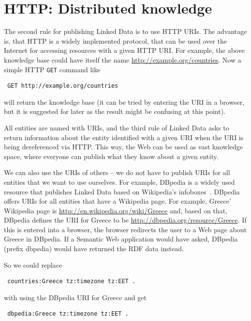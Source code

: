 \section{HTTP: Distributed knowledge}
\label{http}

The second rule for publishing Linked Data is to use HTTP URIs.
The advantage is, that HTTP is a widely implemented protocol, that can be used over the Internet for accessing resources with a given HTTP URI.
For example, the above knowledge base could have itself the name \url{http://example.org/countries}.
Now a simple HTTP \texttt{GET} command like

\begin{verbatim}
 GET http://example.org/countries
\end{verbatim}

will return the knowledge base (it can be tried by entering the URI in a browser, but it is suggested for later as the result might be confusing at this point).

All entities are named with URIs, and the third rule of Linked Data asks to return information about the entity identified with a given URI when the URI is being dereferenced via HTTP.
This way, the Web can be used as vast knowledge space, where everyone can publish what they know about a given entity.

We can also use the URIs of others -- we do not have to publish URIs for all entities that we want to use ourselves.
For example, DBpedia is a widely used resource that publishes Linked Data based on Wikipedia's infoboxes~\cite{dbpedia-swj}.
DBpedia offers URIs for all entities that have a Wikipedia page.
For example, Greece' Wikipedia page is \url{http://en.wikipedia.org/wiki/Greece} and, based on that, DBpedia defines the URI for Greece to be \url{http://dbpedia.org/resource/Greece}.
If this is entered into a browser, the browser redirects the user to a Web page about Greece in DBpedia.
If a Semantic Web application would have asked, DBpedia (prefix dbpedia) would have returned the RDF data instead.

So we could replace

\begin{verbatim}
 countries:Greece tz:timezone tz:EET .
\end{verbatim}

with using the DBpedia URI for Greece and get

\begin{verbatim}
 dbpedia:Greece tz:timezone tz:EET .
\end{verbatim}

